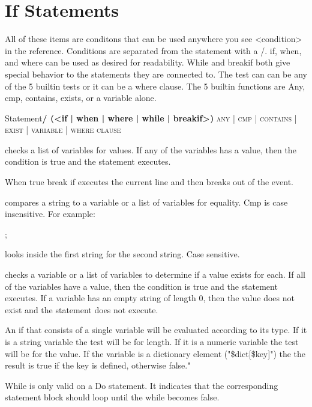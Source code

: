 \section{If Statements}

All of these items are conditons that can be used anywhere you see
<condition> in the reference.  Conditions are separated from the statement
with a /.  if, when, and where can be used as desired for readability. 
While and breakif both give special behavior to the statements they are
connected to.  The test can can be any of the 5 builtin tests or it can
be a where clause.  The 5 builtin functions are Any, cmp, contains, exists,
or a variable alone. 

\large{Statement}\large\textbf{/ (<if | when | where | while | breakif>) } \large\textsc{any | cmp | contains | exist | variable | where clause}

\begin{description}

checks a list of variables for values. If any of the variables has a value, then the condition is true and the statement executes.


When true break if executes the current line and then breaks out of the event. 


compares a string to a variable or a list of variables for equality. Cmp is case insensitive. For example:

;

looks inside the first string for the second string.  Case sensitive.


checks a variable or a list of variables to determine if a value exists for each. If all of the variables have a value, then the condition is true and the statement executes. If a variable has an empty string of length 0, then the value does not exist and the statement does not execute. 


An if that consists of a single variable will be evaluated according to its type. If it is a string variable the test will be for length. If it is a numeric variable the test will be for the value. If the variable is a dictionary element ("\$dict[\$key]") the the result is true if the key is defined, otherwise false." 


While is only valid on a Do statement. It indicates that the corresponding statement block should loop until the while becomes false.

\end{description}
